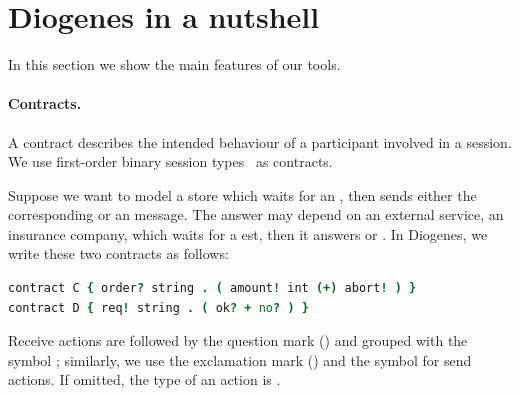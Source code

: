 \section{Diogenes in a nutshell}

In this section we show the main features of our tools.
%



\paragraph{Contracts.}
A contract describes the intended behaviour of a
participant involved in a session.  We use first-order binary session
types~\cite{Honda98esop} as contracts. 

Suppose we want to model a store which waits for an ,
then sends either the corresponding  or an  message.
The answer may depend on an external service, \eg an insurance company,
which waits for a est, then it answers  or .
%
In Diogenes, we write these two contracts as follows:
%
\begin{lstlisting}[language=coco,basicstyle=\scriptsize\ttfamily]
contract C { order? string . ( amount! int (+) abort! ) }
contract D { req! string . ( ok? + no? ) }
\end{lstlisting}
Receive actions are followed by the question mark () and grouped
with the symbol \code{+}; similarly, we use the
exclamation mark (\code{!}) and the symbol \code{(+)} for
send actions. If omitted, the type of an action is .


